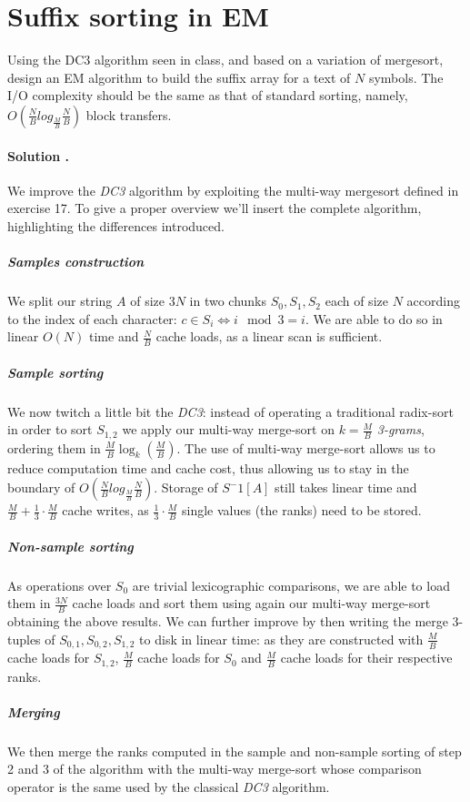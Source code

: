\section{Suffix sorting in EM}
Using the DC3 algorithm seen in class, and based on a variation of mergesort, design an EM algorithm to build the suffix array for a text of $N$ symbols.
The I/O complexity should be the same as that of standard sorting, namely, $O(\frac{N}{B} log_{\frac{M}{B}} \frac{N}{B})$ block transfers.

\vspace{0.5cm}
\paragraph{Solution .}
We improve the \emph{DC3} algorithm by exploiting the multi-way mergesort defined in exercise 17.
To give a proper overview we'll insert the complete algorithm, highlighting the differences introduced.

\subparagraph{Samples construction}
We split our string $A$ of size $3N$ in two chunks $S_0, S_1, S_2$ each of size $N$ according to the index of each character: $c \in S_i \iff i \mod 3 = i$.
We are able to do so in linear $O(N)$ time and $\frac{N}{B}$ cache loads, as a linear scan is sufficient.

\subparagraph{Sample sorting}
We now twitch a little bit the \emph{DC3}: instead of operating a traditional radix-sort in order to sort $S_{1,2}$ we apply our multi-way merge-sort on $k = \frac{M}{B}$ \emph{3-grams}, ordering them in $\frac{M}{B} \log_k(\frac{M}{B})$.
The use of multi-way merge-sort allows us to reduce computation time and cache cost, thus allowing us to stay in the boundary of $O(\frac{N}{B} log_{\frac{M}{B}} \frac{N}{B})$.
Storage of $S^-1[A]$ still takes linear time and $\frac{M}{B} + \frac{1}{3} \cdot \frac{M}{B}$ cache writes, as $\frac{1}{3} \cdot \frac{M}{B}$ single values (the ranks) need to be stored.

\subparagraph{Non-sample sorting}
As operations over $S_0$ are trivial lexicographic comparisons, we are able to load them in $\frac{3N}{B}$ cache loads and sort them using again our multi-way merge-sort obtaining the above results.
We can further improve by then writing the merge 3-tuples of $S_{0,1}, S_{0,2}, S_{1,2}$ to disk in linear time: as they are constructed with $\frac{M}{B}$ cache loads for $S_{1,2}$, $\frac{M}{B}$ cache loads for $S_{0}$ and $\frac{M}{B}$ cache loads for their respective ranks.

\subparagraph{Merging}
We then merge the ranks computed in the sample and non-sample sorting of step 2 and 3 of the algorithm with the multi-way merge-sort whose comparison operator is the same used by the classical \emph{DC3} algorithm.